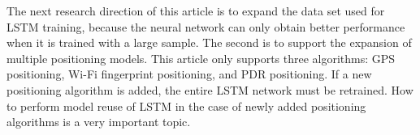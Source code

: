 \documentclass[conference]{IEEEtran}
\begin{document}
The next research direction of this article is to expand the data set used for LSTM training, because the neural network can only obtain better performance when it is trained with a large sample. The second is to support the expansion of multiple positioning models. This article only supports three algorithms: GPS positioning, Wi-Fi fingerprint positioning, and PDR positioning. If a new positioning algorithm is added, the entire LSTM network must be retrained. How to perform model reuse of LSTM in the case of newly added positioning algorithms is a very important topic.



\end{document}
